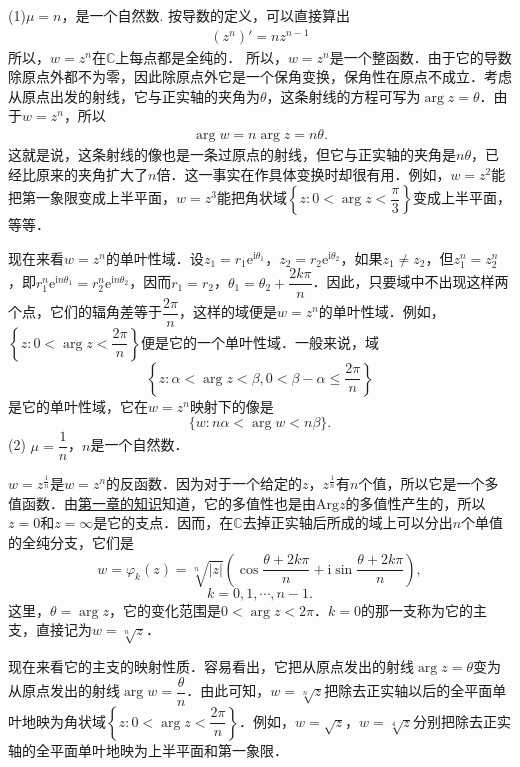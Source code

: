 \documentclass[../../main.tex]{subfiles}
\begin{document}
(1)$\mu = n$，是一个自然数.
按导数的定义，可以直接算出
\begin{align*}
(z^n)' = nz^{n - 1}
\end{align*}
所以，$w = z^n$在$\mathbb{C}$上每点都是全纯的．
所以，$w = z^n$是一个整函数．由于它的导数除原点外都不为零，因此除原点外它是一个保角变换，保角性在原点不成立．考虑从原点出发的射线，它与正实轴的夹角为$\theta$，这条射线的方程可写为$\arg z = \theta$．由于$w = z^n$，所以
\begin{align*}
\arg w = n\arg z = n\theta.
\end{align*}
这就是说，这条射线的像也是一条过原点的射线，但它与正实轴的夹角是$n\theta$，已经比原来的夹角扩大了$n$倍．这一事实在作具体变换时却很有用．例如，$w = z^2$能把第一象限变成上半平面，$w = z^3$能把角状域$\left\{ z: 0 < \arg z < \dfrac{\pi}{3} \right\}$变成上半平面，等等．

现在来看$w = z^n$的单叶性域．设$z_1 = r_1\text{e}^{\text{i}\theta_1}$，$z_2 = r_2\text{e}^{\text{i}\theta_2}$，如果$z_1 \neq z_2$，但$z_1^n = z_2^n$，即$r_1^n\text{e}^{\text{i}n\theta_1} = r_2^n\text{e}^{\text{i}n\theta_2}$，因而$r_1 = r_2$，$\theta_1 = \theta_2 + \dfrac{2k\pi}{n}$．因此，只要域中不出现这样两个点，它们的辐角差等于$\dfrac{2\pi}{n}$，这样的域便是$w = z^n$的单叶性域．例如，$\left\{ z: 0 < \arg z < \dfrac{2\pi}{n} \right\}$便是它的一个单叶性域．一般来说，域
\[
\left\{ z: \alpha < \arg z < \beta, 0 < \beta - \alpha \leqslant \dfrac{2\pi}{n} \right\}
\]
是它的单叶性域，它在$w = z^n$映射下的像是
\[
\{ w: n\alpha < \arg w < n\beta \}.
\]
(2) $\mu = \dfrac{1}{n}$，$n$是一个自然数．

$w = z^{\frac{1}{n}}$是$w = z^n$的反函数．因为对于一个给定的$z$，$z^{\frac{1}{n}}$有$n$个值，所以它是一个多值函数．由\hyperref[section:复数的几何表示]{第一章的知识}知道，它的多值性也是由$\text{Arg}z$的多值性产生的，所以$z = 0$和$z = \infty$是它的支点．因而，在$\mathbb{C}$去掉正实轴后所成的域上可以分出$n$个单值的全纯分支，它们是
\[
w = \varphi_k(z) = \sqrt[n]{|z|} \left( \cos \dfrac{\theta + 2k\pi}{n} + \text{i}\sin \dfrac{\theta + 2k\pi}{n} \right),
\]
\[
k = 0,1,\cdots,n - 1.
\]
这里，$\theta = \arg z$，它的变化范围是$0 < \arg z < 2\pi$．$k = 0$的那一支称为它的主支，直接记为$w = \sqrt[n]{z}$．

现在来看它的主支的映射性质．容易看出，它把从原点发出的射线$\arg z = \theta$变为从原点发出的射线$\arg w = \dfrac{\theta}{n}$．由此可知，$w = \sqrt[n]{z}$把除去正实轴以后的全平面单叶地映为角状域$\left\{ z: 0 < \arg z < \dfrac{2\pi}{n} \right\}$．例如，$w = \sqrt{z}$，$w = \sqrt[4]{z}$分别把除去正实轴的全平面单叶地映为上半平面和第一象限．
\end{document}
